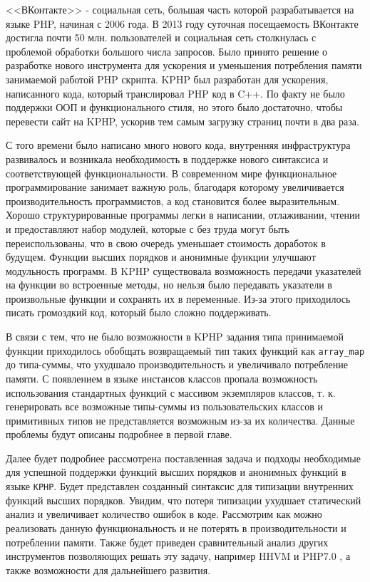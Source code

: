 \startprefacepage
<<ВКонтакте>> - социальная сеть, большая часть которой разрабатывается на языке PHP, начиная с 2006 года.
В 2013 году суточная посещаемость ВКонтакте достигла почти 50 млн. пользователей\cite{kphp-vk-2013} и социальная сеть столкнулась с проблемой обработки большого числа запросов.
Было принято решение о разработке нового инструмента для ускорения и уменьшения потребления памяти занимаемой работой PHP скрипта.
KPHP был разработан для ускорения, написанного кода, который транслировал PHP код в C++.
По факту не было поддержки ООП и функционального стиля, но этого было достаточно, чтобы перевести сайт на KPHP, ускорив тем самым загрузку страниц почти в два раза.

С того времени было написано много нового кода, внутренняя инфраструктура развивалось и возникала необходимость в поддержке нового синтаксиса и соответствующей функциональности.
В современном мире функциональное программирование занимает важную роль, благодаря которому увеличивается производительность программистов, а код становится более выразительным\cite{fp-matters}.
Хорошо структурированные программы легки в написании, отлаживании, чтении и предоставляют набор модулей, которые с без труда могут быть переиспользованы, что в свою очередь уменьшает стоимость доработок в будущем. Функции высших порядков и анонимные функции улучшают модульность программ.
В KPHP существовала возможность передачи указателей на функции во встроенные методы, но нельзя было передавать указатели в произвольные функции и сохранять их в переменные.
Из-за этого приходилось писать громоздкий код, который было сложно поддерживать.

В связи с тем, что не было возможности в KPHP задания типа принимаемой функции приходилось обобщать возвращаемый тип таких функций как \verb|array_map| до типа-суммы, что ухудшало производительность и увеличивало потребление памяти.
С появлением в языке инстансов классов пропала возможность использования стандартных функций с массивом экземпляров классов, т. к. генерировать все возможные типы-суммы из пользовательских классов и примитивных типов не представляется возможным из-за их количества.
Данные проблемы будут описаны подробнее в первой главе.

Далее будет подробнее рассмотрена поставленная задача и подходы необходимые для успешной поддержки функций высших порядков и анонимных функций в языке \verb|KPHP|.
Будет представлен созданный синтаксис для типизации внутренних функций высших порядков.
Увидим, что потеря типизации ухудшает статический анализ и увеличивает количество ошибок в коде.
Рассмотрим как можно реализовать данную функциональность и не потерять в производительности и потреблении памяти.
Также будет приведен сравнительный анализ других инструментов позволяющих решать эту задачу, например HHVM \cite{hhvm} и PHP7.0 \cite{php7}, а также возможности для дальнейшего развития.

